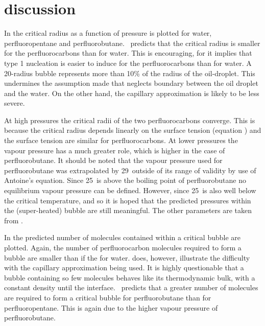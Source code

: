 \section{discussion}

In   the critical radius as a function of pressure is plotted  for water, perfluoropentane and perfluorobutane.
\Cnt\ predicts that the critical radius is smaller for the perfluorocarbons than for water.
This is  encouraging, for it implies that type 1 nucleation is easier to induce for the perfluorocarbons than for water.
A \unit{20}\nano\metre-radius bubble represents more than 10\% of the radius of the oil-droplet.
This undermines the assumption made that  neglects boundary between the oil droplet and the water.
On the other hand, the capillary approximation is likely to be less severe.

At high pressures the critical radii of the two perfluorocarbons converge.
This is because the critical radius depends linearly on the surface tension (equation )
and the surface tension are similar for perfluorocarbons.
At lower pressures the vapour pressure has a much greater role, which is higher in the case of perfluorobutane.
It should be noted that the vapour pressure used for perfluorobutane was extrapolated by \unit{29}\degreecelsius\  outside of its range of validity\cite{NISTdata}
 by use of Antoine's equation.
Since \unit{25}\degreecelsius\ is above the boiling point of perfluorobutane no  equilibrium vapour pressure can be defined.
However, since \unit{25}\degreecelsius\ is also well below the critical temperature, %
and so it is hoped that the predicted pressures within the (super-heated) bubble are still meaningful.
The other parameters are taken from .


In   the predicted number of molecules contained within a critical bubble are plotted.
Again, the number of perfluorocarbon molecules required to form a bubble are smaller than if the for water.
 does, however, illustrate  the difficulty with the capillary approximation being used.
It is highly questionable that a bubble containing so few molecules behaves like its thermodynamic bulk,
with a constant density until the interface.
\Cnt\ predicts that a greater number of molecules are required to form a critical bubble for perfluorobutane than for perfluoropentane.
This is again due to the higher vapour pressure of  perfluorobutane.

